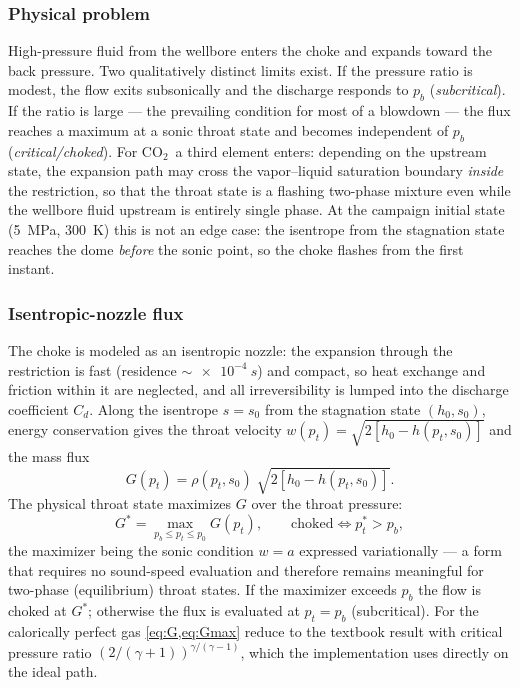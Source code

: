 \documentclass[11pt]{article}
\newcommand{\co}{CO$_2$}
\begin{document}
\subsubsection{Physical problem}

High-pressure fluid from the wellbore enters the choke and expands
toward the back pressure. Two qualitatively distinct limits exist. If
the pressure ratio is modest, the flow exits subsonically and the
discharge responds to $p_b$ (\emph{subcritical}). If the ratio is
large --- the prevailing condition for most of a blowdown --- the flux
reaches a maximum at a sonic throat state and becomes independent of
$p_b$ (\emph{critical/choked}). For \co\ a third element enters:
depending on the upstream state, the expansion path may cross the
vapor--liquid saturation boundary \emph{inside} the restriction, so
that the throat state is a flashing two-phase mixture even while the
wellbore fluid upstream is entirely single phase. At the campaign
initial state (\SI{5}{MPa}, \SI{300}{K}) this is not an edge case: the
isentrope from the stagnation state reaches the dome \emph{before} the
sonic point, so the choke flashes from the first instant.

\subsubsection{Isentropic-nozzle flux}

The choke is modeled as an isentropic nozzle: the expansion through
the restriction is fast (residence $\sim\SI{e-4}{s}$) and compact, so
heat exchange and friction within it are neglected, and all
irreversibility is lumped into the discharge coefficient $C_d$. Along
the isentrope $s = s_0$ from the stagnation state $(h_0, s_0)$,
energy conservation gives the throat velocity
$w(p_t) = \sqrt{2\left[h_0 - h(p_t, s_0)\right]}$ and the mass flux
\begin{equation}
G(p_t) = \rho(p_t, s_0)\;\sqrt{2\left[h_0 - h(p_t, s_0)\right]}.
\label{eq:G}
\end{equation}
The physical throat state maximizes $G$ over the throat pressure:
\begin{equation}
G^* = \max_{p_b \le p_t \le p_0} G(p_t), \qquad
\text{choked} \iff p_t^* > p_b,
\label{eq:Gmax}
\end{equation}
the maximizer being the sonic condition $w = a$ expressed variationally
--- a form that requires no sound-speed evaluation and therefore
remains meaningful for two-phase (equilibrium) throat states. If the
maximizer exceeds $p_b$ the flow is choked at $G^*$; otherwise the flux
is evaluated at $p_t = p_b$ (subcritical). For the calorically perfect
gas \cref{eq:G,eq:Gmax} reduce to the textbook result with critical
pressure ratio $\left(2/(\gamma+1)\right)^{\gamma/(\gamma-1)}$, which
the implementation uses directly on the ideal path.
\end{document}
